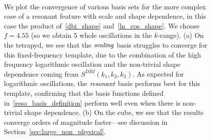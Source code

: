 \begin{figure}[!pth]
\centering     %
\\
\caption{
    We plot the convergence of various basis sets for the more complex case of a resonant
    feature with scale and shape dependence, in this case the product of~\eqref{dbi_shape}
    and~\eqref{ln_cos_shape}.
    We choose $f=4.55$ (so we obtain $5$ whole oscillations in the $k$-range).
    (a) On the tetrapyd, we see that the $\textit{scaling}$ basis struggles to converge for this fixed-frequency
    template, due to the combination of the high frequency logarithmic oscillation
    and the non-trivial shape dependence coming from $S^{DBI}(k_1,k_2,k_3)$.
    As expected for logarithmic oscillations,
    the $\textit{resonant}$ basis performs best for this template, confirming that
    the basis functions defined in~\eqref{reso_basis_definition} perform well
    even when there is non-trivial shape dependence.
    (b) On the cube, we see that the results converge orders of magnitude faster---see
    discussion in Section~\ref{sec:large_non_physical}.
}\label{fig:log_recon_osc_dbiosc}
\end{figure}

